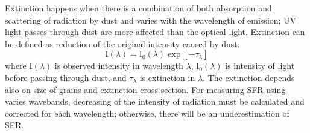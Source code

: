 Extinction happens when there is a combination of both absorption and scattering of radiation by dust and varies with the wavelength of emission; UV light passes through dust are more affected than the optical light.
Extinction can be defined as reduction of the original intensity caused by dust:
\begin{equation}
\label{equ: extinction}
{\mathrm I}(\lambda) = {\mathrm I}_0(\lambda)\exp[-\tau_{\lambda}]
\end{equation}
where I$(\lambda)$ is observed intensity in wavelength $\lambda$, I$_0(\lambda)$ is intensity of light before passing through dust, and $\tau_{\lambda}$ is extinction in $\lambda$.
The extinction depends also on size of grains and extinction cross section.
For measuring SFR using varies wavebands, 
decreasing of the intensity of radiation must be calculated and corrected for each wavelength; otherwise, there will be an underestimation of SFR. 




